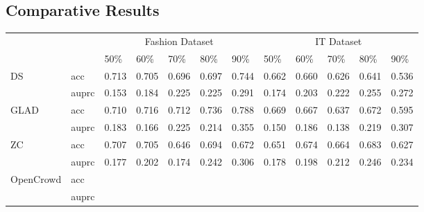 \subsection{Comparative Results}
\begin{table*}[!h]
\begin{tabular}{|l|l|l|l|l|l|l|l|l|l|l|l|}
\hline
\multicolumn{2}{|l|}{\multirow{2}{*}{}} & \multicolumn{5}{c|}{Fashion Dataset}  & \multicolumn{5}{c|}{IT Dataset}       \\ \cline{3-12} 
\multicolumn{2}{|l|}{}                  & 50\%  & 60\%  & 70\%  & 80\%  & 90\%  & 50\%  & 60\%  & 70\%  & 80\%  & 90\%  \\ \hline
\multirow{2}{*}{DS}           & acc     & 0.713 & 0.705 & 0.696 & 0.697 & 0.744 & 0.662 & 0.660 & 0.626 & 0.641 & 0.536 \\ \cline{2-12} 
                              & auprc   & 0.153 & 0.184 & 0.225 & 0.225 & 0.291 & 0.174 & 0.203 & 0.222 & 0.255 & 0.272 \\ \hline
\multirow{2}{*}{GLAD}         & acc     & 0.710 & 0.716 & 0.712 & 0.736 & 0.788 & 0.669 & 0.667 & 0.637 & 0.672      & 0.595       \\ \cline{2-12} 
                              & auprc   & 0.183 & 0.166 & 0.225 & 0.214 & 0.355 & 0.150 & 0.186 & 0.138 & 0.219      &  0.307     \\ \hline
\multirow{2}{*}{ZC}           & acc     & 0.707 & 0.705 & 0.646 & 0.694 & 0.672 & 0.651 & 0.674 & 0.664 & 0.683 & 0.627 \\ \cline{2-12} 
                              & auprc   & 0.177 & 0.202 & 0.174 & 0.242 & 0.306 & 0.178 & 0.198 & 0.212 & 0.246 & 0.234 \\ \hline
\multirow{2}{*}{OpenCrowd}    & acc     &       &       &       &       &       &       &       &       &       &       \\ \cline{2-12} 
                              & auprc   &       &       &       &       &       &       &       &       &       &       \\ \hline
\end{tabular}
\end{table*}
\label{sec:compres}